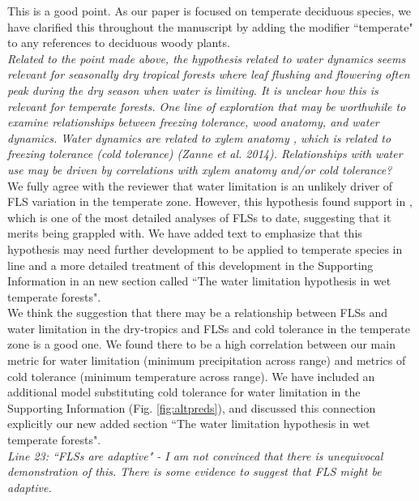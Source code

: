 \documentclass{article}[11pt]
\begin{document}
\noindent This is a good point. As our paper is focused on temperate deciduous species, we have clarified this throughout the manuscript by adding the modifier ``temperate" to any references to deciduous woody plants.\\

\emph{Related to the point made above, the hypothesis related to water dynamics seems relevant for seasonally dry tropical forests where leaf flushing and flowering often peak during the dry season when water is limiting. It is unclear how this is relevant for temperate forests. One line of exploration that may be worthwhile to examine relationships between freezing tolerance, wood anatomy, and water dynamics. Water dynamics are related to xylem anatomy , which is related to freezing tolerance (cold tolerance) (Zanne et al. 2014). Relationships with water use may be driven by correlations with xylem anatomy and/or cold tolerance?}\\

\noindent We fully agree with the reviewer that water limitation is an unlikely driver of FLS variation in the temperate zone. However, this hypothesis found support in \citet{Gougherty2018}, which is one of the most detailed analyses of FLSs to date, suggesting that it merits being grappled with. We have added text to emphasize that this hypothesis may need further development to be applied to temperate species in line  and a more detailed treatment of this development in the Supporting Information in an new section called ``The water limitation hypothesis in wet temperate forests".\\

\noident We think the suggestion that there may be a relationship between FLSs and water limitation in the dry-tropics and FLSs and cold tolerance in the temperate zone is a good one. We found there to be a high correlation between our main metric for water limitation (minimum precipitation across range) and metrics of cold tolerance (minimum temperature across range). We have included an additional model substituting cold tolerance for water limitation in the Supporting Information (Fig. \ref{fig:altpreds}), and discussed this connection explicitly our new added section  ``The water limitation hypothesis in wet temperate forests".\\

\emph{Line 23: ``FLSs are adaptive" - I am not convinced that there is unequivocal demonstration of this. There is some evidence to suggest that FLS might be adaptive.}\\
\end{document}
